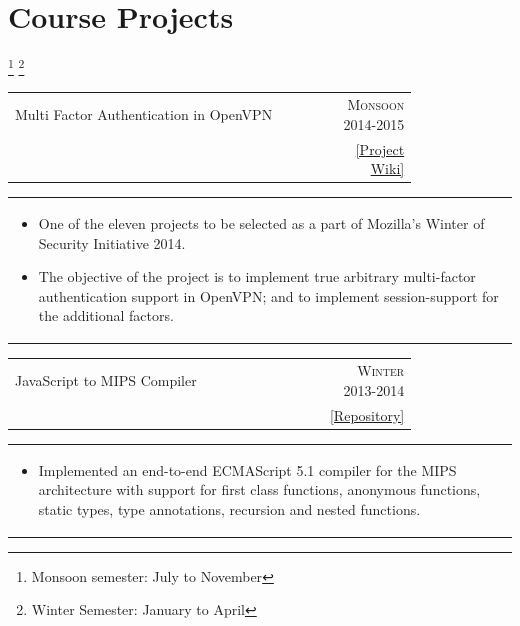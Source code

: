 \documentclass[a4paper,10pt]{article} %
\newcommand{\cproject}[5]{
    \begin{tabular}{p{0.80\linewidth}r}
        \textcolor{NavyBlue}{#2} & \multicolumn{1}{m{4cm}}{\raggedleft \textsc{#1}}\\
        #3 & #4
    \end{tabular}
    \begin{tabular}{p{\linewidth}}
    \vspace{-0.3cm}
        \footnotesize{#5}
    \end{tabular}
    \vspace{-0.5cm}
}
\begin{document}
 \section{Course Projects}
 \let\thefootnote\relax\footnote{Monsoon semester: July to November}
 \let\thefootnote\relax\footnote{Winter Semester: January to April}

\cproject
    {Monsoon 2014-2015}
    {Multi Factor Authentication in OpenVPN}
    {\textsc{\raggedright Mozilla Winter of Security}, Guillaume Destuynder and Professor Dheeraj Sanghi}
    {\href{https://wiki.mozilla.org/Security/Mentorships/MWoS/2014/OpenVPN\_MFA}{ \footnotesize{[Project Wiki]}} }
    {
      \begin{itemize}[leftmargin=0.5cm]
          \item One of the eleven projects to be selected as a part of Mozilla's Winter of Security Initiative 2014.
          \item The objective of the project is to implement true arbitrary multi-factor authentication support in
              OpenVPN; and to implement session-support for the additional factors.
      \end{itemize}
    }

\cproject
    {Winter 2013-2014}
    {JavaScript to MIPS Compiler}
    {\textsc{\raggedright Compilers}, Professor Subhajit Roy}
    { \href{https://github.com/srijanshetty/javascript-compiler} { \footnotesize{[Repository]}} }
    {
      \begin{itemize}[leftmargin=0.5cm]
          \item Implemented an end-to-end ECMAScript 5.1 compiler for the MIPS architecture with support for first class
              functions, anonymous functions, static types, type annotations, recursion and nested functions.
      \end{itemize}
    }
\end{document}
